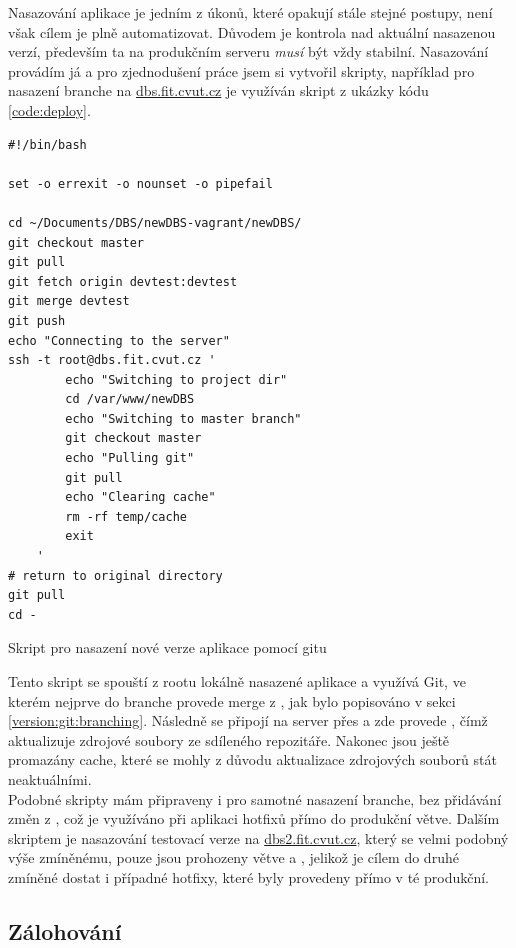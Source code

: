Nasazování aplikace je jedním z úkonů, které opakují stále stejné postupy, není však cílem je plně automatizovat. Důvodem je kontrola nad aktuální nasazenou verzí, především ta na produkčním serveru \emph{musí} být vždy stabilní. Nasazování provádím já a pro zjednodušení práce jsem si vytvořil skripty, například pro nasazení  branche na \url{dbs.fit.cvut.cz} je využíván skript z ukázky kódu \ref{code:deploy}.
\begin{listing}
	\begin{verbatim}
#!/bin/bash

set -o errexit -o nounset -o pipefail

cd ~/Documents/DBS/newDBS-vagrant/newDBS/
git checkout master
git pull
git fetch origin devtest:devtest
git merge devtest
git push
echo "Connecting to the server"
ssh -t root@dbs.fit.cvut.cz '
        echo "Switching to project dir"
        cd /var/www/newDBS
        echo "Switching to master branch"
        git checkout master
        echo "Pulling git"
        git pull
        echo "Clearing cache"
        rm -rf temp/cache
        exit
    '
# return to original directory
git pull
cd -
	\end{verbatim}
	\caption{Skript pro nasazení nové verze aplikace pomocí gitu} \label{code:deploy}
\end{listing}
Tento skript se spouští z rootu lokálně nasazené aplikace a využívá Git, ve kterém nejprve do  branche provede merge z , jak bylo popisováno v sekci \ref{version:git:branching}. Následně se připojí na server přes  a zde provede , čímž aktualizuje zdrojové soubory ze sdíleného repozitáře. Nakonec jsou ještě promazány cache, které se mohly z důvodu aktualizace zdrojových souborů stát neaktuálními.\\
Podobné skripty mám připraveny i pro samotné nasazení  branche, bez přidávání změn z , což je využíváno při aplikaci hotfixů přímo do produkční větve. Dalším skriptem je nasazování testovací verze na \url{dbs2.fit.cvut.cz}, který se velmi podobný výše zmíněnému, pouze jsou prohozeny větve  a , jelikož je cílem do druhé zmíněné dostat i případné hotfixy, které byly provedeny přímo v té produkční.

\subsection{Zálohování}

